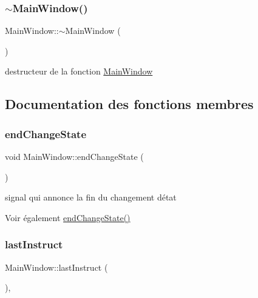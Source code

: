 \subsubsection{\texorpdfstring{$\sim$\+Main\+Window()}{~MainWindow()}}
{\footnotesize\ttfamily Main\+Window\+::$\sim$\+Main\+Window (\begin{DoxyParamCaption}{ }\end{DoxyParamCaption})}



destructeur de la fonction \hyperlink{classMainWindow}{Main\+Window} 



\subsection{Documentation des fonctions membres}
\mbox{\label{classMainWindow_a2cd7fd54c497cd6a073ad43857266890}} 
\subsubsection{\texorpdfstring{end\+Change\+State}{endChangeState}}
{\footnotesize\ttfamily void Main\+Window\+::end\+Change\+State (\begin{DoxyParamCaption}{ }\end{DoxyParamCaption})\hspace{0.3cm}{\ttfamily [signal]}}



signal qui annonce la fin du changement d\textquotesingle{}état 

\begin{DoxySeeAlso}{Voir également}
\hyperlink{classMainWindow_a2cd7fd54c497cd6a073ad43857266890}{end\+Change\+State()} 
\end{DoxySeeAlso}
\mbox{\label{classMainWindow_a715f753a6c46e3f10565a5a1b849ee86}} 
\subsubsection{\texorpdfstring{last\+Instruct}{lastInstruct}}
{\footnotesize\ttfamily Main\+Window\+::last\+Instruct (\begin{DoxyParamCaption}{ }\end{DoxyParamCaption})\hspace{0.3cm}{\ttfamily [private]}, {\ttfamily [slot]}}



